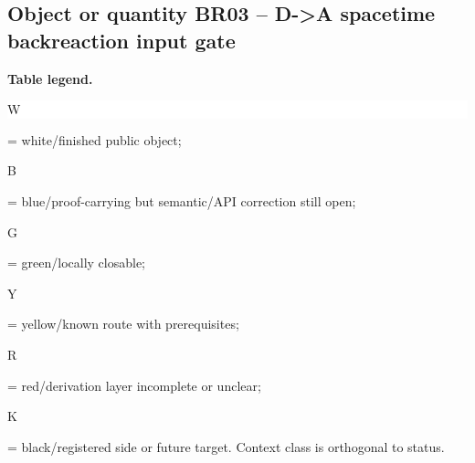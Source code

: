 \subsection*{Object or quantity BR03 -- D->A spacetime backreaction input gate}
\hypertarget{objproof:BR03}{}
\par\smallskip\noindent\begin{minipage}{0.99\linewidth}\footnotesize\raggedright\textbf{Table legend.} \colorbox{white}{\strut W} = white/finished public object; \colorbox{cyan!20}{\strut B} = blue/proof-carrying but semantic/API correction still open; \colorbox{green!18}{\strut G} = green/locally closable; \colorbox{yellow!25}{\strut Y} = yellow/known route with prerequisites; \colorbox{red!20}{\strut R} = red/derivation layer incomplete or unclear; \colorbox{black!18}{\strut K} = black/registered side or future target. Context class is orthogonal to status.\end{minipage}\par\vspace{0.25em}
